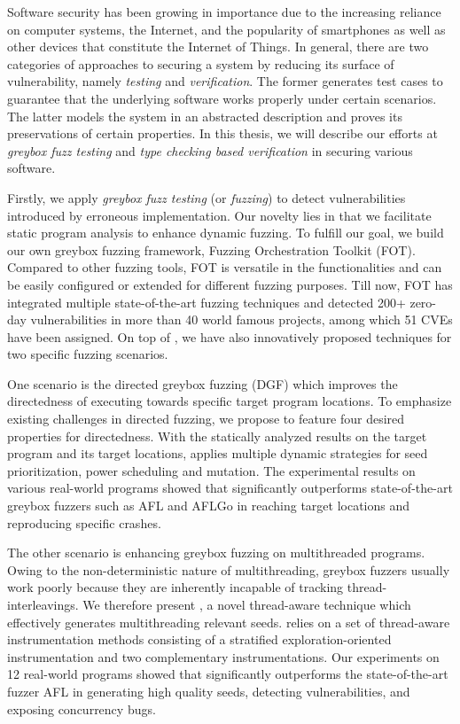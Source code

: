 Software security has been growing in importance due to the increasing reliance on computer systems, the Internet, and the popularity of smartphones as well as other devices that constitute the Internet of Things.
In general, there are two categories of approaches to securing a system by reducing its surface of vulnerability, namely \emph{testing} and \emph{verification}. The former
 generates test cases to guarantee that the underlying software works properly under certain scenarios.
 The latter models the system in an abstracted description and proves its preservations of certain properties.
  In this thesis, we will describe our efforts at \emph{greybox fuzz testing} and \emph{type checking based verification} in securing various software.

Firstly, we apply \emph{greybox fuzz testing} (or \emph{fuzzing}) to detect vulnerabilities introduced by erroneous implementation. Our novelty lies in that we facilitate static program analysis to enhance dynamic fuzzing. To fulfill our goal, we build our own greybox fuzzing framework, Fuzzing Orchestration Toolkit (FOT). Compared to other fuzzing tools, FOT is versatile in the functionalities and can be easily configured or extended for different fuzzing purposes. Till now, FOT has integrated multiple state-of-the-art fuzzing techniques and detected 200+ zero-day vulnerabilities in more than 40 world famous projects, among which 51 CVEs have been assigned.
On top of \FOT, we have also innovatively proposed techniques for two specific fuzzing scenarios.

One scenario is the directed greybox fuzzing (DGF) which improves the directedness of executing towards specific target program locations. To emphasize existing challenges in \mbox{directed} fuzzing, we propose \dFOT to feature four desired properties for directedness. With the statically analyzed results on the target program and its target locations, \dFOT applies multiple dynamic strategies for seed prioritization, power scheduling and \mbox{mutation}.
The experimental results on various real-world \mbox{programs} showed that \dFOT significantly outperforms state-of-the-art greybox fuzzers such as AFL and AFLGo in reaching target locations and reproducing specific crashes.

The other scenario is enhancing greybox fuzzing on multithreaded programs. Owing to the non-deterministic nature of multithreading, greybox fuzzers usually work poorly because they are inherently incapable of tracking thread-interleavings.
We therefore present \mtfuzz, a novel thread-aware technique which effectively generates multithreading relevant seeds. \mtfuzz relies on a set of thread-aware instrumentation methods consisting of a stratified exploration-oriented instrumentation and two complementary instrumentations. Our experiments on 12 real-world programs showed that \mtfuzz significantly outperforms the state-of-the-art fuzzer AFL in generating high quality seeds, detecting vulnerabilities, and exposing concurrency bugs.

